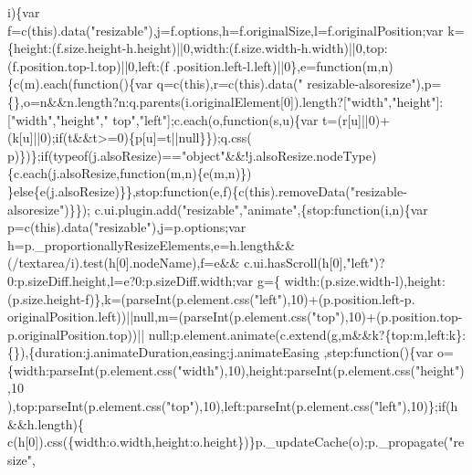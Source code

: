 \begin{DoxyCode}
      i)\{var f=c(\textcolor{keyword}{this}).data(\textcolor{stringliteral}{"resizable"}),j=f.options,h=f.originalSize,l=f.originalPosition;var 
      k=\{height:(f.size.height-h.height)||0,width:(f.size.width-h.width)||0,top:(f.position.top-l.top)||0,left:(f
      .position.left-l.left)||0\},e=\textcolor{keyword}{function}(m,n)\{c(m).each(\textcolor{keyword}{function}()\{var q=c(\textcolor{keyword}{this}),r=c(\textcolor{keyword}{this}).data(\textcolor{stringliteral}{"
      resizable-alsoresize"}),p=\{\},o=n&&n.length?n:q.parents(i.originalElement[0]).length?[\textcolor{stringliteral}{"width"},\textcolor{stringliteral}{"height"}]:[\textcolor{stringliteral}{"width"},\textcolor{stringliteral}{"height"},\textcolor{stringliteral}{"
      top"},\textcolor{stringliteral}{"left"}];c.each(o,\textcolor{keyword}{function}(s,u)\{var t=(r[u]||0)+(k[u]||0);\textcolor{keywordflow}{if}(t&&t>=0)\{p[u]=t||null\}\});q.css(
      p)\})\};\textcolor{keywordflow}{if}(typeof(j.alsoResize)==\textcolor{stringliteral}{"object"}&&!j.alsoResize.nodeType)\{c.each(j.alsoResize,\textcolor{keyword}{function}(m,n)\{e(m,n)\})
      \}\textcolor{keywordflow}{else}\{e(j.alsoResize)\}\},stop:\textcolor{keyword}{function}(e,f)\{c(\textcolor{keyword}{this}).removeData(\textcolor{stringliteral}{"resizable-alsoresize"})\}\});
      c.ui.plugin.add(\textcolor{stringliteral}{"resizable"},\textcolor{stringliteral}{"animate"},\{stop:\textcolor{keyword}{function}(i,n)\{var p=c(\textcolor{keyword}{this}).data(\textcolor{stringliteral}{"resizable"}),j=p.options;var 
      h=p.\_proportionallyResizeElements,e=h.length&&(/textarea/i).test(h[0].nodeName),f=e&&
      c.ui.hasScroll(h[0],\textcolor{stringliteral}{"left"})?0:p.sizeDiff.height,l=e?0:p.sizeDiff.width;var g=\{
      width:(p.size.width-l),height:(p.size.height-f)\},k=(parseInt(p.element.css(\textcolor{stringliteral}{"left"}),10)+(p.position.left-p.
      originalPosition.left))||null,m=(parseInt(p.element.css(\textcolor{stringliteral}{"top"}),10)+(p.position.top-p.originalPosition.top))||
      null;p.element.animate(c.extend(g,m&&k?\{top:m,left:k\}:\{\}),\{duration:j.animateDuration,easing:j.animateEasing
      ,step:\textcolor{keyword}{function}()\{var o=\{width:parseInt(p.element.css(\textcolor{stringliteral}{"width"}),10),height:parseInt(p.element.css(\textcolor{stringliteral}{"height"}),10
      ),top:parseInt(p.element.css(\textcolor{stringliteral}{"top"}),10),left:parseInt(p.element.css(\textcolor{stringliteral}{"left"}),10)\};\textcolor{keywordflow}{if}(h&&h.length)\{
      c(h[0]).css(\{width:o.width,height:o.height\})\}p.\_updateCache(o);p.\_propagate(\textcolor{stringliteral}{"resize"},

\end{DoxyCode}
